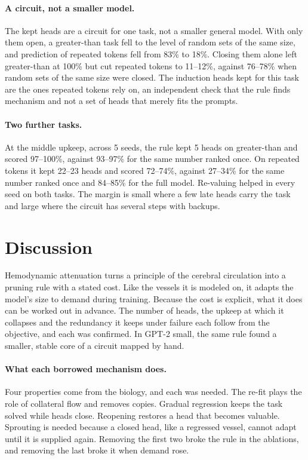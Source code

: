 \documentclass[letterpaper]{article} %
\begin{document}
\paragraph{A circuit, not a smaller model.} The kept heads are a circuit for one task, not a smaller general model. With only them open, a greater-than task fell to the level of random sets of the same size, and prediction of repeated tokens fell from 83\% to 18\%. Closing them alone left greater-than at 100\% but cut repeated tokens to 11--12\%, against 76--78\% when random sets of the same size were closed. The induction heads kept for this task are the ones repeated tokens rely on, an independent check that the rule finds mechanism and not a set of heads that merely fits the prompts.

\paragraph{Two further tasks.} At the middle upkeep, across 5 seeds, the rule kept 5 heads on greater-than and scored 97--100\%, against 93--97\% for the same number ranked once. On repeated tokens it kept 22--23 heads and scored 72--74\%, against 27--34\% for the same number ranked once and 84--85\% for the full model. Re-valuing helped in every seed on both tasks. The margin is small where a few late heads carry the task and large where the circuit has several steps with backups.

\section{Discussion}

Hemodynamic attenuation turns a principle of the cerebral circulation into a pruning rule with a stated cost. Like the vessels it is modeled on, it adapts the model's size to demand during training. Because the cost is explicit, what it does can be worked out in advance. The number of heads, the upkeep at which it collapses and the redundancy it keeps under failure each follow from the objective, and each was confirmed. In GPT-2 small, the same rule found a smaller, stable core of a circuit mapped by hand.

\paragraph{What each borrowed mechanism does.} Four properties come from the biology, and each was needed. The re-fit plays the role of collateral flow and removes copies. Gradual regression keeps the task solved while heads close. Reopening restores a head that becomes valuable. Sprouting is needed because a closed head, like a regressed vessel, cannot adapt until it is supplied again. Removing the first two broke the rule in the ablations, and removing the last broke it when demand rose.
\end{document}
